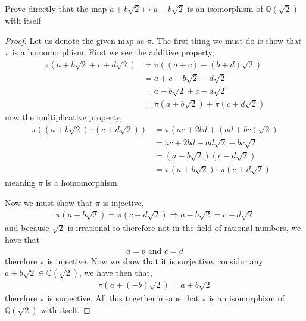 \documentclass[11pt]{article}
\newenvironment{problem}[2][Problem\!]{\begin{tcolorbox}\begin{trivlist}
\item[\hskip \labelsep {\bfseries #1}\hskip \labelsep {\bfseries #2}]}{\end{trivlist}\end{tcolorbox}}
\newcommand{\qq}{\mathbb Q}   %
\begin{document}
\begin{problem}{13.1.4}
    Prove directly that the map $a + b\sqrt{2} \mapsto a - b\sqrt{2}$ is an isomorphism of $\qq(\sqrt2)$ with itself 
\end{problem}
\begin{proof}
    Let us denote the given map as $\pi$. The first thing we must do is show that $\pi$ is a homomorphism. First we see the additive property, 
    \begin{align*}
        \pi(a + b\sqrt2 + c + d\sqrt2) &= \pi((a+c) + (b + d)\sqrt{2}) \\
        &= a+c -b\sqrt2 - d\sqrt2 \\
        &= a - b\sqrt2 +c - d\sqrt2  \\ 
        &= \pi( a + b\sqrt2) + \pi(c + d\sqrt2)
    \end{align*}
    now the multiplicative property,
    \begin{align*}
        \pi((a+b\sqrt2)\cdot (c+d\sqrt2)) &= \pi(ac + 2bd + (ad+bc)\sqrt2) \\
        &= ac +2bd -ad\sqrt2 -bc\sqrt2 \\ 
        &= (a-b\sqrt2)(c-d\sqrt2) \\
        &= \pi(a+b\sqrt2)\cdot \pi(c + d\sqrt2)
    \end{align*}
    meaning $\pi$ is a homomorphism. 

    Now we must show that $\pi$ is injective,
    \begin{align*}
        \pi(a +b \sqrt2) = \pi(c + d\sqrt2) \Rightarrow a-b\sqrt2 = c -d \sqrt2
    \end{align*}
    and because $\sqrt2$ is irrational so therefore not in the field of rational numbers, we have that
    \begin{align*}
        a = b \text{ and } c = d
    \end{align*}
    therefore $\pi$ is injective. Now we show that it is surjective, consider any $a+ b\sqrt2 \in \qq(\sqrt2)$, we have then that,
    \begin{align*}
        \pi(a + (-b)\sqrt2) = a+b \sqrt2
    \end{align*}
    therefore $\pi$ is surjective. All this together means that $\pi$ is an isomorphism of $\qq(\sqrt2)$ with itself. 
\end{proof}
\end{document}
